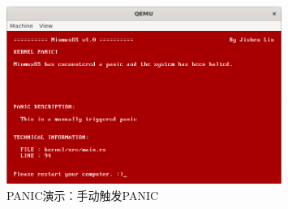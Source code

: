\begin{figure}[htbp]
    \centering
    \includegraphics[width=0.8\textwidth]{figures/ManuallyTriggeredPanicPresentation.png}
    \caption{PANIC演示：手动触发PANIC}
\end{figure}